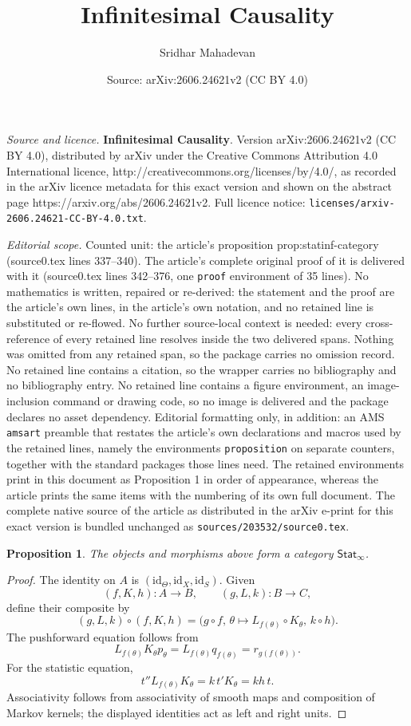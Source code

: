 \documentclass[10pt,a4paper]{amsart}
\title{\textbf{Infinitesimal Causality}}
\author{Sridhar Mahadevan}
\date{Source: arXiv:2606.24621v2 (CC BY 4.0)}
\newtheorem{proposition}{Proposition}
\newcommand{\StatInf}{\mathsf{Stat}_{\infty}}
\newcommand{\id}{\mathrm{id}}
\begin{document}
\maketitle

\noindent\emph{Source and licence.} \textbf{Infinitesimal Causality}. Version arXiv:2606.24621v2 (CC BY 4.0), distributed by arXiv under the Creative Commons Attribution 4.0 International licence, http://creativecommons.org/licenses/by/4.0/, as recorded in the arXiv licence metadata for this exact version and shown on the abstract page https://arxiv.org/abs/2606.24621v2. Full licence notice: \texttt{licenses/arxiv-2606.24621-CC-BY-4.0.txt}.\par\smallskip

\noindent\textit{Editorial scope.} Counted unit: the article's proposition prop:statinf-category (source0.tex lines 337--340). The article's complete original proof of it is delivered with it (source0.tex lines 342--376, one \texttt{proof} environment of 35 lines). No mathematics is written, repaired or re-derived: the statement and the proof are the article's own lines, in the article's own notation, and no retained line is substituted or re-flowed.  No further source-local context is needed: every cross-reference of every retained line resolves inside the two delivered spans.  Nothing was omitted from any retained span, so the package carries no omission record.  No retained line contains a citation, so the wrapper carries no bibliography and no bibliography entry.  No retained line contains a figure environment, an image-inclusion command or drawing code, so no image is delivered and the package declares no asset dependency.  Editorial formatting only, in addition: an AMS \texttt{amsart} preamble that restates the article's own declarations and macros used by the retained lines, namely the environments \texttt{proposition} on separate counters, together with the standard packages those lines need.  The retained environments print in this document as Proposition 1 in order of appearance, whereas the article prints the same items with the numbering of its own full document.  The complete native source of the article as distributed in the arXiv e-print for this exact version is bundled unchanged as \texttt{sources/203532/source0.tex}.
\begin{proposition}
\label{prop:statinf-category}
The objects and morphisms above form a category \(\StatInf\).
\end{proposition}

\begin{proof}
The identity on \(A\) is
\((\id_\Theta,\id_X,\id_S)\).  Given
\[
  (f,K,h):A\to B,
  \qquad
  (g,L,k):B\to C,
\]
define their composite by
\[
  (g,L,k)\circ(f,K,h)
  =
  \bigl(g\circ f,\,
        \theta\mapsto L_{f(\theta)}\circ K_\theta,\,
        k\circ h\bigr).
\]
The pushforward equation follows from
\[
  L_{f(\theta)}K_\theta p_\theta
  =
  L_{f(\theta)}q_{f(\theta)}
  =
  r_{g(f(\theta))}.
\]
For the statistic equation,
\[
  t''L_{f(\theta)}K_\theta
  =
  k\,t'K_\theta
  =
  kh\,t.
\]
Associativity follows from associativity of smooth maps and composition of
Markov kernels; the displayed identities act as left and right units.
\end{proof}
\end{document}
